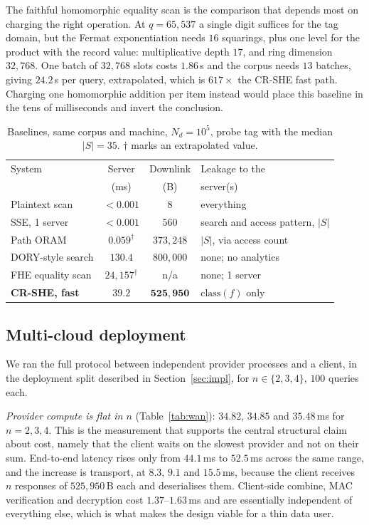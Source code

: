 \documentclass[a4paper,fleqn]{cas-dc}
\begin{document}
The faithful homomorphic equality scan is the comparison that depends most on
charging the right operation. At $q=65{,}537$ a single digit suffices for the
tag domain, but the Fermat exponentiation needs $16$ squarings, plus one level
for the product with the record value: multiplicative depth $17$, and ring
dimension $32{,}768$. One batch of $32{,}768$ slots costs $1.86$\,s and the
corpus needs $13$ batches, giving $24.2$\,s per query, extrapolated, which is
$617\times$ the CR-SHE fast path. Charging one homomorphic addition per item
instead would place this baseline in the tens of milliseconds and invert the
conclusion.

\begin{table}[pos=t]
\caption{Baselines, same corpus and machine, $N_d=10^5$, probe tag with the
median $|S|=35$. $\dagger$ marks an extrapolated value.}
\label{tab:baselines}
\centering
\footnotesize
\setlength{\tabcolsep}{3pt}
\renewcommand{\arraystretch}{1.2}
\begin{tabular}{@{}lcc>{\raggedright\arraybackslash}p{2.1cm}@{}}
\toprule
System & Server & Downlink & Leakage to the \\
       & (ms)   & (B)      & server(s) \\
\midrule
Plaintext scan        & $<0.001$ & $8$              & everything \\
SSE, 1 server         & $<0.001$ & $560$            & search and access
pattern, $|S|$ \\
Path ORAM             & $0.059^{\dagger}$ & $373{,}248$ & $|S|$, via access
count \\
DORY-style search     & $130.4$  & $800{,}000$      & none; no analytics \\
FHE equality scan     & $24{,}157^{\dagger}$ & n/a & none; 1 server \\
\midrule
\textbf{CR-SHE, fast} & $\mathbf{39.2}$ & $\mathbf{525{,}950}$ &
$\mathrm{class}(f)$ only \\
\bottomrule
\end{tabular}
\end{table}

\subsection{Multi-cloud deployment}
\label{sec:wanresult}
We ran the full protocol between independent provider processes and a client,
in the deployment split described in Section~\ref{sec:impl}, for
$n\in\{2,3,4\}$, $100$ queries each.

\emph{Provider compute is flat in $n$} (Table~\ref{tab:wan}): $34.82$, $34.85$
and $35.48$\,ms for $n=2,3,4$. This is the measurement that supports the
central structural claim about cost, namely that the client waits on the
slowest provider and not on their sum. End-to-end latency rises only from
$44.1$\,ms to $52.5$\,ms across the same range, and the increase is transport,
at $8.3$, $9.1$ and $15.5$\,ms, because the client receives $n$ responses of
$525{,}950$\,B each and deserialises them. Client-side combine, MAC
verification and decryption cost $1.37$--$1.63$\,ms and are essentially
independent of everything else, which is what makes the design viable for a
thin data user.
\end{document}
